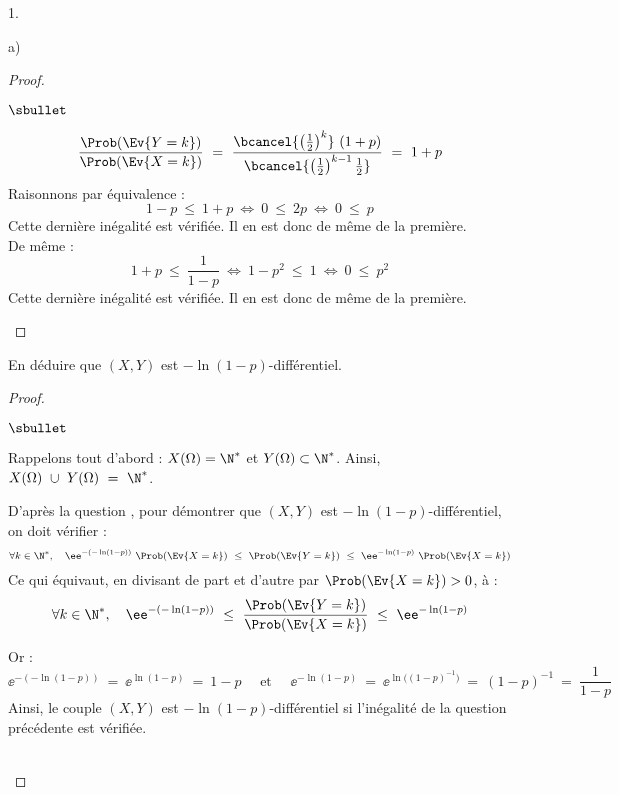 \documentclass[11pt]{article}%
\begin{document}
\begin{noliste}{1.}
\begin{noliste}{a)}
\begin{proof}
\begin{noliste}{$\sbullet$}
      \item {}
        \[
        \dfrac{\Prob(\Ev{Y = k})}{\Prob(\Ev{X = k})} \ = \
        \dfrac{\bcancel{\left( \frac{1}{2} \right)^{k}} \ (1 +
          p)}{\bcancel{\left( \frac{1}{2} \right)^{k-1} \frac{1}{2}}}
        \ = \ 1+p
        \]
        Raisonnons par équivalence :
        \[
        1 - p \ \leq \ 1 + p \ \Leftrightarrow \ 0 \ \leq \ 2 p \
        \Leftrightarrow \ 0 \ \leq \ p
        \]
        Cette dernière inégalité est vérifiée. Il en est donc de même
        de la première.\\
        De même :
        \[
        1+p \ \leq \ \dfrac{1}{1-p} \ \Leftrightarrow \ 1-p^2 \ \leq \
        1 \ \Leftrightarrow \ 0 \ \leq \ p^2
        \]
        Cette dernière inégalité est vérifiée. Il en est donc de même
        de la première.%
        ~\\[-1.2cm]
      \end{noliste}
    \end{proof}
    
    
    

  \item En déduire que $(X,Y)$ est $-\ln(1-p)$-différentiel.

    \begin{proof}~%
      \begin{noliste}{$\sbullet$}
      \item Rappelons tout d'abord : $X(\Omega) = \N^*$ et $Y(\Omega)
        \subset \N^*$. Ainsi, $X(\Omega) \ \cup \ Y(\Omega) \ = \ \N^*$.

      \item D'après la question , pour démontrer que $(X, Y)$
        est $-\ln(1-p)$-différentiel, on doit vérifier :
        \[
        \forall k \in \N^*, \quad \ee^{-(-\ln(1-p))} \ \Prob(\Ev{X = k}) 
\
        \leq \ \Prob(\Ev{Y = k}) \ \leq \ \ee^{-\ln(1-p)} \
        \Prob(\Ev{X = k})
        \]
        Ce qui équivaut, en divisant de part et d'autre par
        $\Prob(\Ev{X = k}) > 0$, à :
        \[
        \forall k \in \N^*, \quad \ee^{-(-\ln(1-p))} \ \leq \
        \dfrac{\Prob(\Ev{Y = k})}{\Prob(\Ev{X = k})} \ \leq \
        \ee^{-\ln(1-p)}
        \]

      \item Or :
        \[
        \ee^{-(-\ln(1-p))} \ = \ \ee^{\ln(1-p)} \ = \ 1 - p \quad
        \text{ et } \quad \ee^{-\ln(1-p)} \ = \ \ee^{\ln\big(
          (1-p)^{-1} \big)} \ = \ (1 - p)^{-1} \ = \ \dfrac{1}{1-p}
        \]
        Ainsi, le couple $(X, Y)$ est $-\ln(1-p)$-différentiel si
        l'inégalité de la question précédente est vérifiée.
      \end{noliste}
      ~\\[-1.2cm]
    \end{proof}


\end{noliste}
\end{noliste}
\end{document}
